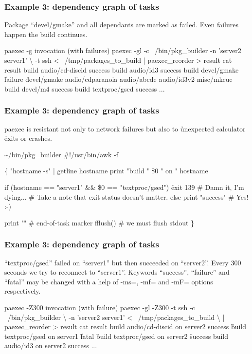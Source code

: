 \documentclass[hyperref={colorlinks=true}]{beamer}
\begin{document}
\begin{frame}[fragile]
  \frametitle{Example 3: dependency graph of tasks}
Package ``devel/gmake'' and all dependants are marked as failed.
Even failures happen the build continues.
  \begin{block}{}
      \begin{CodeSmall}{paexec -g invocation (with failures)}
\prompt{\$} paexec -gl -c ~/bin/pkg_builder -n 'server2 server1' \textbackslash
    -t ssh < ~/tmp/packages_to_build | paexec_reorder > result
\prompt{\$} cat result
build audio/cd-discid
success
build audio/id3
success
build devel/gmake
\h{failure}
\h{devel/gmake audio/cdparanoia audio/abcde audio/id3v2 misc/mkcue}
build devel/m4
success
build textproc/gsed
success
...
\prompt{\$}
      \end{CodeSmall}
  \end{block}
\end{frame}

\begin{frame}[fragile]
  \frametitle{Example 3: dependency graph of tasks}
paexec is resistant not only to network failures but also to
\h{unexpected} calculator \h{exits or crashes}.
  \begin{block}{}
      \begin{CodeSmall}{\~{}/bin/pkg\_builder}
#!/usr/bin/awk -f

\{
   "hostname -s" | getline hostname
   print "build " \$0 " on " hostname

   if (hostname == "server1" && \$0 == "textproc/gsed")
      \h{exit 139}
      # Damn it, I'm dying...
      # Take a note that exit status doesn't matter.
   else
      print "success" # Yes! :-)

   print ""        # end-of-task marker
   fflush()        # we must flush stdout
\}
      \end{CodeSmall}
  \end{block}
\end{frame}

\begin{frame}[fragile]
  \frametitle{Example 3: dependency graph of tasks}
``textproc/gsed'' failed on ``server1'' but then succeeded on ``server2''.
Every 300 seconds we try to reconnect to ``server1''. Keywords ``success'',
``failure'' and ``fatal'' may be changed with a help of -ms=, -mf= and
-mF= options respectively.
  \begin{block}{}
      \begin{CodeSmall}{paexec -Z300 invocation (with failure)}
\prompt{\$} paexec -gl -Z300 -t ssh -c ~/bin/pkg_builder \textbackslash
      -n 'server2 server1' < ~/tmp/packages_to_build \textbackslash
      | paexec_reorder > result
\prompt{\$} cat result
build audio/cd-discid on server2
success
\h{build textproc/gsed on server1}
\h{fatal}
\h{build textproc/gsed on server2}
\h{success}
build audio/id3 on server2
success
...
\prompt{\$}
      \end{CodeSmall}
  \end{block}
\end{frame}
\end{document}
